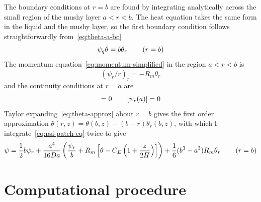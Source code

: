\documentclass[11pt]{proc}
\begin{document}
The boundary conditions at $r=b$ are found by integrating analytically across the small region of the mushy layer $a < r < b$. The heat equation takes the same form in the liquid and the mushy layer, so the first boundary condition follows straightforwardly from~\ref{eq:theta-a-bc}
\begin{equation}
\psi_q \theta = b \theta_r  \hspace{5ex} (r=b)
\end{equation}
The momentum equation~\eqref{eq:momentum-simplified} in the region $a < r < b$ is
\begin{equation}
\label{eq:psi-patch-eq}
(\psi_r/r)_r = -R_m \theta_r
\end{equation}
and the continuity conditions at $r=a$ are
\begin{equation}
[\psi(a)] = 0 \hspace{5ex} [\psi_r(a)] = 0
\end{equation}
Taylor expanding~\eqref{eq:theta-approx} about $r=b$ gives the first order approximation $\theta(r, z) = \theta(b, z) - (b-r) \theta_r(b, z)$, with which I integrate~\eqref{eq:psi-patch-eq} twice to give
\begin{equation}
  \psi = \frac{1}{2} b \psi_r + \frac{a^4}{16 Da} \left(  \frac{\psi_r}{b}  +   R_m \left[ \theta - C_E \left( 1 + \frac{z}{2H} \right) \right]  \right)  + \frac{1}{6} (b^3-a^3) R_m \theta_r \hspace{5ex} (r=b)
\end{equation}

\section{Computational procedure}
\label{sec:computational-procedure}
\end{document}

